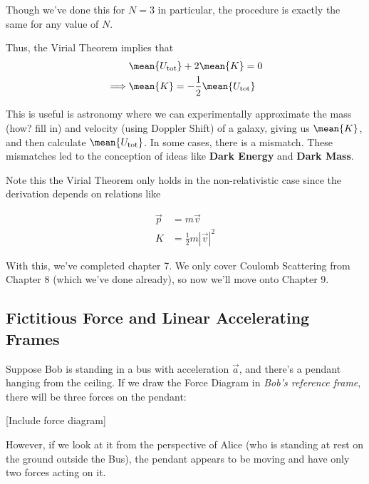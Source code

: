 \documentclass[11pt]{article}
\begin{document}
Though we've done this for $N = 3$ in particular, the procedure is exactly the same for any value of $N$. 

\begin{bluebox}
  Thus, the Virial Theorem implies that 
  \begin{align*}
    &\mean{U_{\text{tot}}} + 2\mean{K} = 0 \\
    \implies& \mean{K} = - \frac{1}{2} \mean{U_\text{tot}}
  \end{align*}
\end{bluebox}

\begin{redbox}
  This is useful is astronomy where we can experimentally approximate the mass (how? fill in) and velocity (using Doppler Shift) of a galaxy, giving us $\mean{K}$, and then calculate $\mean{U_{\text{tot}}}$.
  \vskip 0.5cm
  In some cases, there is a mismatch. These mismatches led to the conception of ideas like \textbf{Dark Energy} and \textbf{Dark Mass}.
\end{redbox}

\begin{redbox}
  Note this the Virial Theorem only holds in the non-relativistic case since the derivation depends on relations like 

  \begin{align*}
    \vec{p} &= m\vec{v} \\
    K &= \frac{1}{2} m\left|\vec{v}\right|^2
  \end{align*}
\end{redbox}

With this, we've completed chapter 7. We only cover Coulomb Scattering from Chapter 8 (which we've done already), so now we'll move onto Chapter 9.

\subsection{Fictitious Force and Linear Accelerating Frames}
Suppose Bob is standing in a bus with acceleration $\vec{a}$, and there's a pendant hanging from the ceiling. If we draw the Force Diagram in \emph{Bob's reference frame}, there will be three forces on the pendant:

\vskip 0.5cm
[Include force diagram]
\vskip 0.5cm

However, if we look at it from the perspective of Alice (who is standing at rest on the ground outside the Bus), the pendant appears to be moving and have only two forces acting on it.
\end{document}
